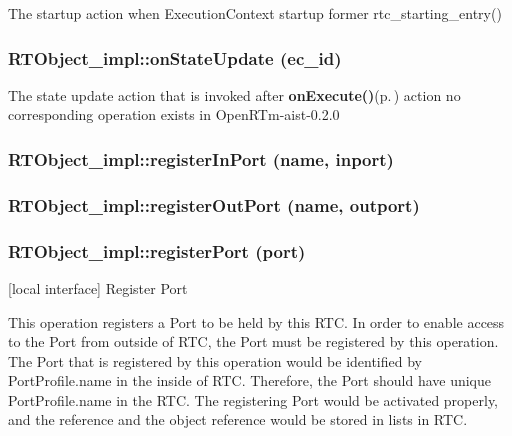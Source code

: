 The startup action when Execution\-Context startup former rtc\_\-starting\_\-entry()
\subsubsection{\setlength{\rightskip}{0pt plus 5cm}RTObject\_\-impl::on\-State\-Update (ec\_\-id)}\label{classRTObject__impl_RTObject__impla11}


The state update action that is invoked after {\bf on\-Execute()}{\rm (p.\,\pageref{classRTObject__impl_RTObject__impla7})} action no corresponding operation exists in Open\-RTm-aist-0.2.0
\subsubsection{\setlength{\rightskip}{0pt plus 5cm}RTObject\_\-impl::register\-In\-Port (name, inport)}\label{classRTObject__impl_RTObject__impla63}


\subsubsection{\setlength{\rightskip}{0pt plus 5cm}RTObject\_\-impl::register\-Out\-Port (name, outport)}\label{classRTObject__impl_RTObject__impla64}


\subsubsection{\setlength{\rightskip}{0pt plus 5cm}RTObject\_\-impl::register\-Port (port)}\label{classRTObject__impl_RTObject__impla62}


[local interface] Register Port 

This operation registers a Port to be held by this RTC. In order to enable access to the Port from outside of RTC, the Port must be registered by this operation. The Port that is registered by this operation would be identified by Port\-Profile.name in the inside of RTC. Therefore, the Port should have unique Port\-Profile.name in the RTC. The registering Port would be activated properly, and the reference and the object reference would be stored in lists in RTC.

